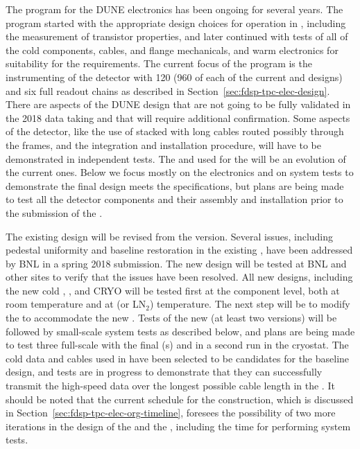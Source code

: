 The  program for the DUNE  electronics has been ongoing for several years.  The  program started with the appropriate design choices for operation
in \lar, including the measurement of transistor properties, and later
continued with tests of all of the cold components, cables, \fdth and flange mechanicals, and warm electronics for suitability for the  requirements.  The current focus of the  program is the instrumenting of the  detector with \num{120}  (\num{960} of each of the current  and   designs) and six full  readout chains as described in Section~\ref{sec:fdsp-tpc-elec-design}. There are aspects of the DUNE design that are not going to be fully validated in the 2018  data taking and that will require additional confirmation. Some aspects of the detector, like the use of stacked  with long cables routed possibly through the  frames, and the integration and installation procedure, will have to be demonstrated in independent tests. The  and  used for the  will be an evolution of the current  ones. Below we focus mostly on the electronics and on system tests to demonstrate the final design meets the  specifications, but plans are being made to test all the detector components and their assembly and installation prior to the submission of the .

The existing  design will be revised from the  version. Several issues, 
including pedestal uniformity and baseline restoration in the existing , have been 
addressed by BNL in a spring 2018 submission. The new design will be tested at BNL and other sites to 
verify that the issues have been resolved. All new  designs, including the new cold , , and CRYO will be tested first at the component level, both at room temperature and at \lar (or LN$_2$) temperature. The next step will be to modify the  to accommodate the new .  Tests of the new  (at least two versions) will be followed by small-scale system tests as described below, and plans are being made to test three full-scale  with the final (s) and  in a second run in the  cryostat.  The cold data and  cables used in  have been selected to be candidates for the  baseline design, and tests are in progress to demonstrate that they can successfully transmit the high-speed data over the longest possible cable length in the . It should be noted that the current schedule for the  construction, which is discussed in Section~\ref{sec:fdsp-tpc-elec-org-timeline}, foresees the possibility of two more iterations in the design of the  and the , including the time for performing system tests.

